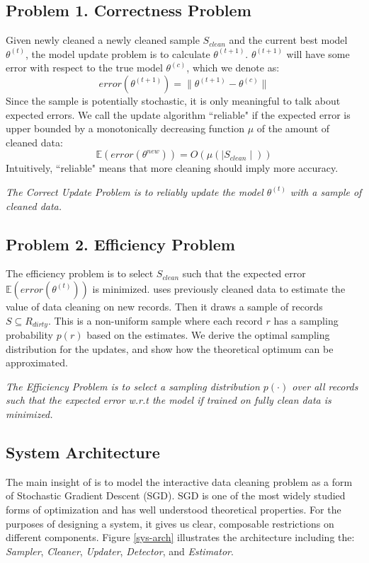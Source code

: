 \subsection{Problem 1. Correctness Problem}\label{updp}
Given newly cleaned a newly cleaned sample $S_{clean}$ and the current best model $\theta^{(t)}$, the model update problem is to calculate $\theta^{(t+1)}$. 
$\theta^{(t+1)}$ will have some error with respect to the true model $\theta^{(c)}$, which we denote as:
\[
error(\theta^{(t+1)}) = \| \theta^{(t+1)} - \theta^{(c)} \|
\]
Since the sample is potentially stochastic, it is only meaningful to talk about expected errors.
We call the update algorithm ``reliable" if the expected error is upper bounded by a monotonically decreasing function $\mu$ of the amount of cleaned data:
\[
\mathbb{E}(error(\theta^{new})) = O(\mu(\mid S_{clean} \mid))
\]
Intuitively, ``reliable" means that more cleaning should imply more accuracy.

\vspace{0.5em}

\emph{The Correct Update Problem is to reliably update the model $\theta^{(t)}$ with a sample of cleaned data.}

\subsection{Problem 2. Efficiency Problem}\label{optp}
The efficiency problem is to select $S_{clean}$ such that the expected error $\mathbb{E}(error(\theta^{(t)}))$ is minimized.
\sys uses previously cleaned data to estimate the value of data cleaning on new records.
Then it draws a sample of records $S \subseteq R_{dirty}$. 
This is a non-uniform sample where each record $r$ has a sampling probability $p(r)$ based on the estimates.
We derive the optimal sampling distribution for the updates, and show how the theoretical optimum can be approximated.

\vspace{0.5em}

\emph{The Efficiency Problem is to select a sampling distribution $p(\cdot)$ over all records such that the expected error w.r.t the model if trained on fully clean data is minimized.}

\subsection{System Architecture}\label{syarch}
The main insight of \sys is to model the interactive data cleaning problem as a form of Stochastic Gradient Descent (SGD).
SGD is one of the most widely studied forms of optimization and has well understood theoretical properties.
For the purposes of designing a system, it gives us clear, composable restrictions on different components.
Figure \ref{sys-arch} illustrates the \sys architecture including the: {\it Sampler}, {\it Cleaner}, \emph{Updater}, {\it Detector}, and {\it Estimator}.

